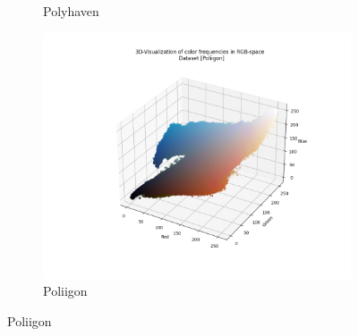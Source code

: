 \begin{figure}[htbp]
\begin{subfigure}{.33\textwidth}
          \caption{Polyhaven}
          \label{fig:dataset-Polyhaven}
        \end{subfigure}%
        \hfill
        \begin{subfigure}{.33\textwidth}
          \centering
          \includegraphics[width=\linewidth]{../code/dataAnalysis/output/Poliigon.png}
          \caption{Poliigon}
          \label{fig:dataset-Poliigon}
        \end{subfigure}
        
        \vspace{1cm} %
        

\end{figure}
